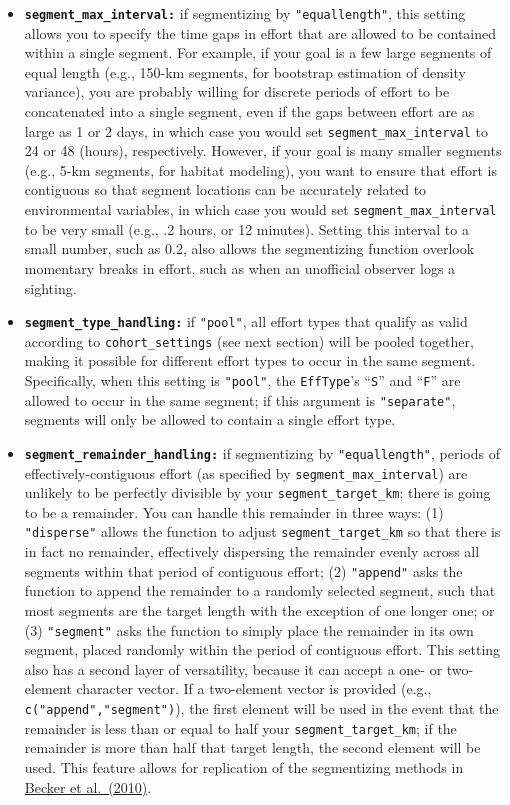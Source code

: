 \documentclass[
]{book}
\begin{document}
\begin{itemize}
\item
  \textbf{\texttt{segment\_max\_interval:}} if segmentizing by \texttt{"equallength"}, this setting allows you to specify the time gaps in effort that are allowed to be contained within a single segment. For example, if your goal is a few large segments of equal length (e.g., 150-km segments, for bootstrap estimation of density variance), you are probably willing for discrete periods of effort to be concatenated into a single segment, even if the gaps between effort are as large as 1 or 2 days, in which case you would set \texttt{segment\_max\_interval} to 24 or 48 (hours), respectively. However, if your goal is many smaller segments (e.g., 5-km segments, for habitat modeling), you want to ensure that effort is contiguous so that segment locations can be accurately related to environmental variables, in which case you would set \texttt{segment\_max\_interval} to be very small (e.g., .2 hours, or 12 minutes). Setting this interval to a small number, such as 0.2, also allows the segmentizing function overlook momentary breaks in effort, such as when an unofficial observer logs a sighting.
\item
  \textbf{\texttt{segment\_type\_handling:}} if \texttt{"pool"}, all effort types that qualify as valid according to \texttt{cohort\_settings} (see next section) will be pooled together, making it possible for different effort types to occur in the same segment. Specifically, when this setting is \texttt{"pool"}, the \texttt{EffType}'s ``\texttt{S}'' and ``\texttt{F}'' are allowed to occur in the same segment; if this argument is \texttt{"separate"}, segments will only be allowed to contain a single effort type.
\item
  \textbf{\texttt{segment\_remainder\_handling:}} if segmentizing by \texttt{"equallength"}, periods of effectively-contiguous effort (as specified by \texttt{segment\_max\_interval}) are unlikely to be perfectly divisible by your \texttt{segment\_target\_km}; there is going to be a remainder. You can handle this remainder in three ways: (1) \texttt{"disperse"} allows the function to adjust \texttt{segment\_target\_km} so that there is in fact no remainder, effectively dispersing the remainder evenly across all segments within that period of contiguous effort; (2) \texttt{"append"} asks the function to append the remainder to a randomly selected segment, such that most segments are the target length with the exception of one longer one; or (3) \texttt{"segment"} asks the function to simply place the remainder in its own segment, placed randomly within the period of contiguous effort. This setting also has a second layer of versatility, because it can accept a one- or two-element character vector. If a two-element vector is provided (e.g., \texttt{c("append","segment")}), the first element will be used in the event that the remainder is less than or equal to half your \texttt{segment\_target\_km}; if the remainder is more than half that target length, the second element will be used. This feature allows for replication of the segmentizing methods in \href{https://www.int-res.com/abstracts/meps/v413/p163-183/}{Becker et al.~(2010)}.
\end{itemize}
\end{document}
